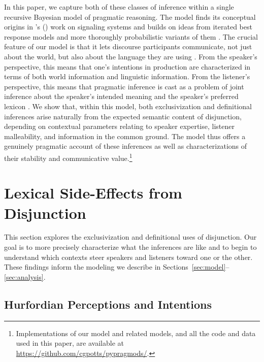 \documentclass[12pt,twoside]{article}
\newcommand{\dashsecref}[2]{Sections~\ref{#1}--\ref{#2}}
\newcommand{\posscitet}[1]{\citeauthor{#1}'s (\citeyear{#1})}
\renewcommand{\_}{\textbf{\textunderscore\hspace{-4pt}\textunderscore\hspace{-3pt}\textunderscore\hspace{-4pt}\textunderscore}\hspace{0.5pt}}			%
\begin{document}
In this paper, we capture both of these classes of inference within a
single recursive Bayesian model of pragmatic reasoning. The model
finds its conceptual origins in \posscitet{Lewis69} work on signaling
systems and builds on ideas from iterated best response models
\citep{Jaeger:2007,Jaeger:2011,Franke09DISS} and more thoroughly
probabilistic variants of them
\citep{CamererHo:2004,Frank:Goodman:2012,Russell:2012}. The crucial
feature of our model is that it lets discourse participants
communicate, not just about the world, but also about the language
they are using
\citep{Bergen:Goodman:Levy:2012,bergen-levy-goodman:2014}. From the
speaker's perspective, this means that one's intentions in production
are characterized in terms of both world information and linguistic
information. From the listener's perspective, this means that
pragmatic inference is cast as a problem of joint inference about the
speaker's intended meaning and the speaker's preferred lexicon
\citep{Smith:Goodman:Frank:2013}. We show that, within this model,
both exclusivization and definitional inferences arise naturally from
the expected semantic content of disjunction, depending on contextual
parameters relating to speaker expertise, listener malleability, and
information in the common ground. The model thus offers a genuinely
pragmatic account of these inferences as well as characterizations of
their stability and communicative value.\footnote{Implementations of
  our model and related models, and all the code and data used in this
  paper, are available at
  \url{https://github.com/cgpotts/pypragmods/}.}


\section{Lexical Side-Effects from Disjunction}\label{sec:data}

This section explores the exclusivization and definitional uses of
disjunction. Our goal is to more precisely characterize what the
inferences are like and to begin to understand which contexts steer
speakers and listeners toward one or the other. These findings inform
the modeling we describe in \dashsecref{sec:model}{sec:analysis}.


\subsection{Hurfordian Perceptions and Intentions}\label{sec:data:overlapping}
\end{document}
